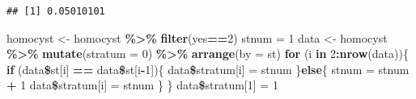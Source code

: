\documentclass[]{article}
\newenvironment{Shaded}{\begin{snugshade}}{\end{snugshade}}
\newcommand{\KeywordTok}[1]{\textcolor[rgb]{0.13,0.29,0.53}{\textbf{#1}}}
\newcommand{\DataTypeTok}[1]{\textcolor[rgb]{0.13,0.29,0.53}{#1}}
\newcommand{\DecValTok}[1]{\textcolor[rgb]{0.00,0.00,0.81}{#1}}
\newcommand{\StringTok}[1]{\textcolor[rgb]{0.31,0.60,0.02}{#1}}
\newcommand{\ControlFlowTok}[1]{\textcolor[rgb]{0.13,0.29,0.53}{\textbf{#1}}}
\newcommand{\OperatorTok}[1]{\textcolor[rgb]{0.81,0.36,0.00}{\textbf{#1}}}
\newcommand{\NormalTok}[1]{#1}
\begin{document}
\begin{verbatim}
## [1] 0.05010101
\end{verbatim}

\begin{Shaded}
\begin{Highlighting}[]
\NormalTok{homocyst <-}\StringTok{ }\NormalTok{homocyst }\OperatorTok{\%>\%}
\StringTok{  }\KeywordTok{filter}\NormalTok{(yes}\OperatorTok{==}\DecValTok{2}\NormalTok{)}
\NormalTok{stnum =}\StringTok{ }\DecValTok{1}
\NormalTok{data <-}\StringTok{ }\NormalTok{homocyst }\OperatorTok{\%>\%}
\StringTok{  }\KeywordTok{mutate}\NormalTok{(}\DataTypeTok{stratum =} \DecValTok{0}\NormalTok{) }\OperatorTok{\%>\%}
\StringTok{  }\KeywordTok{arrange}\NormalTok{(}\DataTypeTok{by =}\NormalTok{ st)}
\ControlFlowTok{for}\NormalTok{ (i }\ControlFlowTok{in} \DecValTok{2}\OperatorTok{:}\KeywordTok{nrow}\NormalTok{(data))\{}
  \ControlFlowTok{if}\NormalTok{ (data}\OperatorTok{\$}\NormalTok{st[i] }\OperatorTok{==}\StringTok{ }\NormalTok{data}\OperatorTok{\$}\NormalTok{st[i}\OperatorTok{-}\DecValTok{1}\NormalTok{])\{}
\NormalTok{    data}\OperatorTok{\$}\NormalTok{stratum[i] =}\StringTok{ }\NormalTok{stnum}
\NormalTok{  \}}\ControlFlowTok{else}\NormalTok{\{}
\NormalTok{    stnum =}\StringTok{ }\NormalTok{stnum }\OperatorTok{+}\StringTok{ }\DecValTok{1}
\NormalTok{    data}\OperatorTok{\$}\NormalTok{stratum[i] =}\StringTok{ }\NormalTok{stnum}
\NormalTok{  \}}
\NormalTok{\}}
\NormalTok{data}\OperatorTok{\$}\NormalTok{stratum[}\DecValTok{1}\NormalTok{] =}\StringTok{ }\DecValTok{1}
\end{Highlighting}
\end{Shaded}
\end{document}
